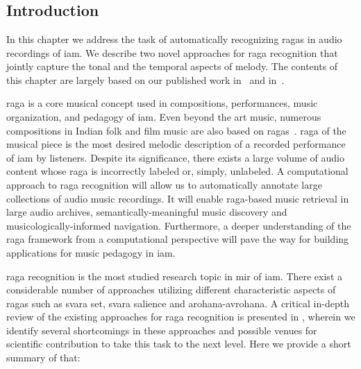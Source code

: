 
\chapter{}
\label{chap:raga_recognition}


\section{Introduction}
\label{sec:raga_rec_intro}

In this chapter we address the task of automatically recognizing \glspl{raga} in audio recordings of \gls{iam}. We describe two novel approaches for \gls{raga} recognition that jointly capture the tonal and the temporal aspects of melody. The contents of this chapter are largely based on our published work in~\cite{gulatiphrase_2016} and in~\cite{gulati_tdms_2016}.

\Gls{raga} is a core musical concept used in compositions, performances, music organization, and pedagogy of \gls{iam}. Even beyond the art music, numerous compositions in Indian folk and film music are also based on \glspl{raga}~\citep{ganti2013bollywood}. \Gls{raga} of the musical piece is the most desired melodic description of a recorded performance of \gls{iam} by listeners. Despite its significance, there exists a large volume of audio content whose \gls{raga} is incorrectly labeled or, simply, unlabeled. A computational approach to \gls{raga} recognition will allow us to automatically annotate large collections of audio music recordings. It will enable \gls{raga}-based music retrieval in large audio archives, semantically-meaningful music discovery and musicologically-informed navigation. Furthermore, a deeper understanding of the \gls{raga} framework from a computational perspective will pave the way for building applications for music pedagogy in \gls{iam}. 

\Gls{raga} recognition is the most studied research topic in \gls{mir} of \gls{iam}. There exist a considerable number of approaches utilizing different characteristic aspects of \glspl{raga} such as \gls{svara} set, \gls{svara} salience and \gls{arohana}-\gls{avrohana}. A critical in-depth review of the existing approaches for \gls{raga} recognition is presented in , wherein we identify several shortcomings in these approaches and possible venues for scientific contribution to take this task to the next level. Here we provide a short summary of that: 

